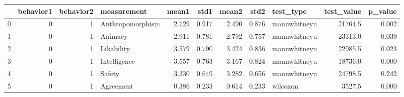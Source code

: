 \begin{tabular}{lrrlrrrrlrr}
\toprule
{} &  behavior1 &  behavior2 &       measurement &  mean1 &   std1 &  mean2 &   std2 &     test\_type &  test\_value &  p\_value \\
\midrule
0 &          0 &          1 &  Anthropomorphism &  2.729 &  0.917 &  2.490 &  0.876 &  mannwhitneyu &     21764.5 &    0.002 \\
1 &          0 &          1 &           Animacy &  2.911 &  0.781 &  2.792 &  0.757 &  mannwhitneyu &     23313.0 &    0.039 \\
2 &          0 &          1 &        Likability &  3.579 &  0.790 &  3.424 &  0.836 &  mannwhitneyu &     22985.5 &    0.023 \\
3 &          0 &          1 &      Intelligence &  3.557 &  0.763 &  3.167 &  0.824 &  mannwhitneyu &     18736.0 &    0.000 \\
4 &          0 &          1 &            Safety &  3.330 &  0.649 &  3.282 &  0.656 &  mannwhitneyu &     24798.5 &    0.242 \\
5 &          0 &          1 &         Agreement &  0.386 &  0.233 &  0.614 &  0.233 &      wilcoxon &      3527.5 &    0.000 \\
\bottomrule
\end{tabular}
